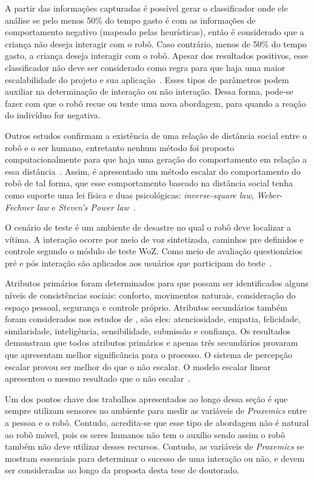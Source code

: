 A partir das informações capturadas é possível gerar o classificador onde ele análise se pelo menos 50\% do tempo gasto é com as informações de comportamento negativo (mapeado pelas heurísticas), então é considerado que a criança não deseja interagir com o robô. Caso contrário, menos de 50\% do tempo gasto, a criança deseja interagir com o robô. Apesar dos resultados positivos, esse classificador não deve ser considerado como regra para que haja uma maior escalabilidade do projeto e sua aplicação~\cite{Feil-Seifer:2010}. Esses tipos de parâmetros podem auxiliar na determinação de interação ou não interação. Dessa forma, pode-se fazer com que o robô recue ou tente uma nova abordagem, para quando a reação do indivíduo for negativa.

Outros estudos confirmam a existência de uma relação de distância social entre o robô e o ser humano, entretanto nenhum método foi proposto computacionalmente para que haja uma geração do comportamento em relação a essa distância~\cite{Henkel:2012b}. Assim, é apresentado um método escalar do comportamento do robô de tal forma, que esse comportamento baseado na distância social tenha como suporte uma lei física e duas psicológicas: \emph{inverse-square law}, \emph{Weber-Fechner law} e \emph{Steven's Power law}~\cite{Henkel:2012b}.

O cenário de teste é um ambiente de desastre no qual o robô deve localizar a vítima. A interação ocorre por meio de voz sintetizada, caminhos pre definidos e controle segundo o módulo de teste WoZ. Como meio de avaliação questionários pré e pós interação são aplicados aos usuários que participam do teste~\cite{Henkel:2012b}.

Atributos primários foram determinados para que possam ser identificados alguns níveis de consistências sociais: conforto, movimentos naturais, consideração do espaço pessoal, segurança e controle próprio. Atributos secundários também foram considerados nos estudos de , são eles: atenciosidade, empatia, felicidade, similaridade, inteligência, sensibilidade, submissão e confiança. Os resultados demonstram que todos atributos primários e apenas três secundários provaram que apresentam melhor significância para o processo. O sistema de percepção escalar provou ser melhor do que o não escalar. O modelo escalar linear apresentou o mesmo resultado que o não escalar~\cite{Henkel:2012b}.

Um dos pontos chave dos trabalhos apresentados ao longo dessa seção é que sempre utilizam sensores no ambiente para medir as variáveis de \emph{Proxemics} entre a pessoa e o robô. Contudo, acredita-se que esse tipo de abordagem não é natural ao robô móvel, pois os seres humanos não tem o auxílio sendo assim o robô também não deve utilizar desses recursos. Contudo, as variáveis de \emph{Proxemics} se mostram essenciais para determinar o sucesso de uma interação ou não, e devem ser consideradas ao longo da proposta desta tese de doutorado.

